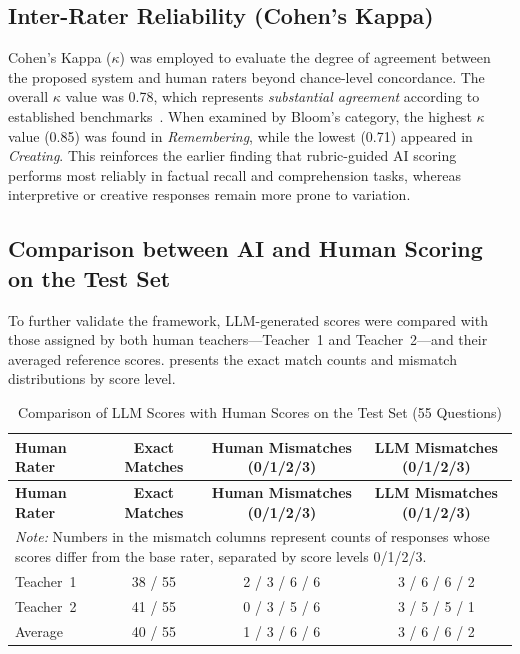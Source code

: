 \subsection{Inter-Rater Reliability (Cohen’s Kappa)}

Cohen’s Kappa ($\kappa$) was employed to evaluate the degree 
of agreement between the proposed system and human raters 
beyond chance-level concordance.  
The overall $\kappa$ value was 0.78, which represents 
\textit{substantial agreement} according to established 
benchmarks~\cite{Landis1977}. When examined by Bloom’s 
category, the highest $\kappa$ value (0.85) was found in 
\textit{Remembering}, while the lowest (0.71) appeared in 
\textit{Creating}. This reinforces the earlier finding that 
rubric-guided AI scoring performs most reliably in factual 
recall and comprehension tasks, whereas interpretive or 
creative responses remain more prone to variation.

\subsection{Comparison between AI and Human Scoring on the Test Set}

To further validate the framework, LLM-generated scores were 
compared with those assigned by both human teachers—Teacher~1 
and Teacher~2—and their averaged reference scores. 
 presents the exact match 
counts and mismatch distributions by score level.

{
\setlength{\LTleft}{-0.7cm}
\setlength{\LTright}{0pt}
\centering
\begin{longtable}{l c c c}
    \caption{Comparison of LLM Scores with Human Scores on the Test Set (55 Questions)}
    \label{tab:ai_human_comparison}
    \\

    \hline
    \textbf{Human Rater} & \textbf{Exact Matches} & \textbf{Human Mismatches (0/1/2/3)} & \textbf{LLM Mismatches (0/1/2/3)} \\
    \hline
    \endfirsthead

    \hline
    \textbf{Human Rater} & \textbf{Exact Matches} & \textbf{Human Mismatches (0/1/2/3)} & \textbf{LLM Mismatches (0/1/2/3)} \\
    \hline
    \endhead

    \hline
    \multicolumn{4}{p{0.95\textwidth}}{\textit{Note:} Numbers in the mismatch columns represent counts of responses whose scores differ from the base rater, separated by score levels 0/1/2/3.} \\
    \endfoot

    Teacher~1 & 38 / 55 & 2 / 3 / 6 / 6 & 3 / 6 / 6 / 2 \\
    Teacher~2 & 41 / 55 & 0 / 3 / 5 / 6 & 3 / 5 / 5 / 1 \\
    Average & 40 / 55 & 1 / 3 / 6 / 6 & 3 / 6 / 6 / 2 \\

\end{longtable}
}

